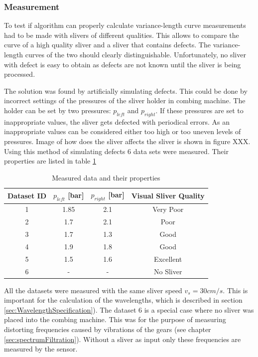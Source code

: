 \documentclass[twoside]{ctuthesis}
\theoremstyle{plain}
\theoremstyle{definition}
\theoremstyle{note}
\begin{document}
\subsubsection{Measurement}
To test if algorithm can properly calculate variance-length curve measurements had to be made with slivers of different qualities. This allows to compare the curve of a high quality sliver and a sliver that contains defects. The variance-length curves of the two should clearly distinguishable. Unfortunately, no sliver with defect is easy to obtain as defects are not known until the sliver is being processed. 

The solution was found by artificially simulating defects. This could be done by incorrect settings of the pressures of the sliver holder in combing machine. The holder can be set by two pressures: $p_{left}$ and $p_{right}$. If these pressures are set to inappropriate values, the sliver gets defected with periodical errors. As an inappropriate values can be considered either too high or too uneven levels of pressures. Image of how does the sliver affects the sliver is shown in figure XXX.
Using this method of simulating defects 6 data sets were measured. Their properties are listed in table \ref{tab:measuredData}%
\begin{table}[htbp]
	\centering
	\caption{Measured data and their properties}
	\begin{tabular}{cccc}
		\toprule
		Dataset ID & $p_{left}$ [bar] & $p_{right}$ [bar] & Visual Sliver Quality \\
		\midrule
		1     & 1.85  & 2.1   & Very Poor \\
		2     & 1.7   & 2.1   & Poor \\
		3     & 1.7   & 1.3   & Good \\
		4     & 1.9   & 1.8   & Good \\
		5     & 1.5   & 1.6   & Excellent \\
		6     & -     & -     & No Sliver \\
		\bottomrule
	\end{tabular}%
	\label{tab:measuredData}%
\end{table}%
All the datasets were measured with the same sliver speed $v_s=30cm/s$. This is important for the calculation of the wavelengths, which is described in section \ref{sec:WavelengthSpecification}).
The dataset 6 is a special case where no sliver was placed into the combing machine. This was for the purpose of measuring distorting frequencies caused by vibrations of the gears (see chapter \ref{sec:spectrumFiltration}). Without a sliver as input only these frequencies are measured by the sensor.
\end{document}
